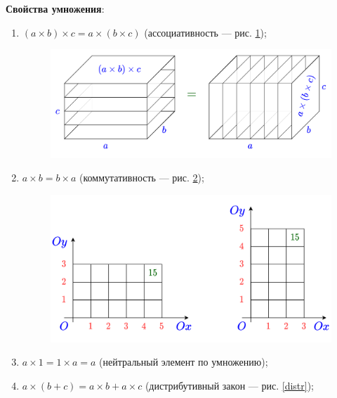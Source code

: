 \textbf{Свойства умножения}:
\begin{enumerate}[label=P\arabic*]
\item $(a\times b)\times c = a\times (b\times c)$ (ассоциативность --- рис. \ref{assoc});

\begin{figure}[hbt!]
\begin{center}
\includegraphics[scale=0.2]{assoc.png}
\end{center}
\caption{}\label{assoc}
\end{figure}

\item $a\times b=b\times a$ (коммутативность --- рис. \ref{kommut});

\begin{figure}[hbt!]
\begin{center}
\includegraphics[scale=0.2]{kommut.png}
\end{center}
\caption{}\label{kommut}
\end{figure}

\item $a\times 1=1\times a=a$ (нейтральный элемент по умножению);

\item $a\times(b+c)=a\times b+a\times c$ (дистрибутивный закон --- рис. \ref{distr});


\end{enumerate}
